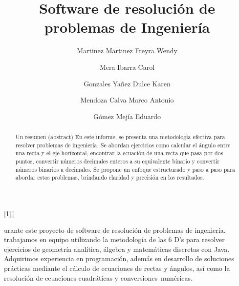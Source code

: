 \documentclass{IEEEcsmag}
\begin{document}
[1][]
{}
{}



\title{Software de resolución de problemas de Ingeniería }

\author{Martinez Martinez Freyra Wendy}

\author{Mera Ibarra Carol}

\author{Gonzales Yañez Dulce Karen}

\author{Mendoza Calva Marco Antonio}

\author{Gómez Mejía Eduardo}



\begin{abstract}
Un resumen (abstract) En este informe, se presenta una metodología efectiva para resolver problemas de ingeniería. Se abordan ejercicios como calcular el ángulo entre una recta y el eje horizontal, encontrar la ecuación de una recta que pasa por dos puntos, convertir números decimales enteros a su equivalente binario y convertir números binarios a decimales. Se propone un enfoque estructurado y paso a paso para abordar estos problemas, brindando claridad y precisión en los resultados.
\end{abstract}

\maketitle
{}urante este proyecto de software de resolución de problemas de ingeniería, trabajamos en equipo utilizando la metodología de las 6 D's para resolver ejercicios de geometría analítica, álgebra y matemáticas discretas con Java. Adquirimos experiencia en programación, además en desarrollo de soluciones prácticas mediante el cálculo de ecuaciones de rectas y ángulos, así como la resolución de ecuaciones cuadráticas y conversiones numéricas.
\end{document}
